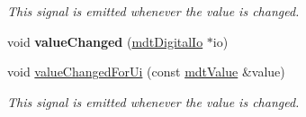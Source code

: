 \begin{DoxyCompactItemize}
\begin{DoxyCompactList}\small\item\em This signal is emitted whenever the value is changed. \end{DoxyCompactList}\item 
\hypertarget{classmdt_abstract_io_a0cde4ddd086886c50bfaeef27ac9de3b}{
void {\bfseries valueChanged} (\hyperlink{classmdt_digital_io}{mdtDigitalIo} $\ast$io)}
\label{classmdt_abstract_io_a0cde4ddd086886c50bfaeef27ac9de3b}

\item 
void \hyperlink{classmdt_abstract_io_a0241183736b9bc3abb021868b9bf4273}{valueChangedForUi} (const \hyperlink{classmdt_value}{mdtValue} \&value)
\begin{DoxyCompactList}\small\item\em This signal is emitted whenever the value is changed. \end{DoxyCompactList}\end{DoxyCompactItemize}
